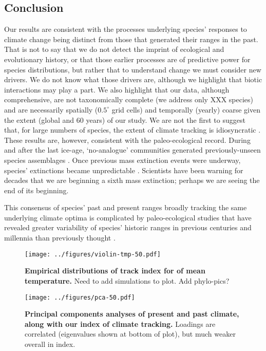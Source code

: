 \documentclass[12pt]{report}
\begin{document}
\subsection*{Conclusion}
Our results are consistent with the processes underlying species'
responses to climate change being distinct from those that generated
their ranges in the past. That is not to say that we do not detect the
imprint of ecological and evolutionary history, or that those earlier
processes are of predictive power for species distributions, but
rather that to understand change we must consider new drivers. We do
not know what those drivers are, although we highlight that biotic
interactions may play a part. We also highlight that our data,
although comprehensive, are not taxonomically complete (we address
only XXX species) and are necessarily spatially ($0.5^\circ$ grid
cells) and temporally (yearly) coarse given the extent (global and 60
years) of our study. We are not the first to suggest that, for large
numbers of species, the extent of climate tracking is idiosyncratic
\supercite{xxx}. These results are, however, consistent with the
paleo-ecological record. During and after the last ice-age,
`no-analogue' communities generated previously-unseen species
assemblages \supercite{xxx}. Once previous mass extinction events were
underway, species' extinctions became unpredictable
\supercite{xxx}. Scientists have been warning for decades that we are
beginning a sixth mass extinction;
perhaps we are seeing the end of its beginning.

This consensus of species' past and present ranges broadly tracking
the same underlying climate optima is complicated by paleo-ecological
studies that have revealed greater variability of species' historic
ranges in previous centuries and millennia than previously thought
\supercite{Williams2007,Veloz2012,Maguire2015}.

\clearpage

\begin{figure}[h!]
  \begin{center}
    \texttt{[image: ../figures/violin-tmp-50.pdf]}
  \end{center}
  \caption{\doublespacing \textbf{Empirical distributions of track
      index for  of mean temperature.} Need to add simulations
    to plot. Add phylo-pics?}
  \label{violin}
\end{figure}

\begin{figure}[h!]
  \begin{center}
    \texttt{[image: ../figures/pca-50.pdf]}
  \end{center}
  \caption{\doublespacing \textbf{Principal components analyses of
      present and past climate, along with our index of climate
      tracking.} Loadings are correlated (eigenvalues shown at bottom
    of plot), but much weaker overall in index.}
  \label{pca}
\end{figure}
\end{document}
